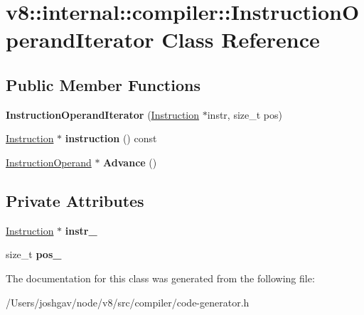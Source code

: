 \hypertarget{classv8_1_1internal_1_1compiler_1_1_instruction_operand_iterator}{}\section{v8\+:\+:internal\+:\+:compiler\+:\+:Instruction\+Operand\+Iterator Class Reference}
\label{classv8_1_1internal_1_1compiler_1_1_instruction_operand_iterator}
\subsection*{Public Member Functions}
\begin{DoxyCompactItemize}
\item 
{\bfseries Instruction\+Operand\+Iterator} (\hyperlink{classv8_1_1internal_1_1compiler_1_1_instruction}{Instruction} $\ast$instr, size\+\_\+t pos)\hypertarget{classv8_1_1internal_1_1compiler_1_1_instruction_operand_iterator_a14f190926e67ab3adf9a1f7df7fbcaf0}{}\label{classv8_1_1internal_1_1compiler_1_1_instruction_operand_iterator_a14f190926e67ab3adf9a1f7df7fbcaf0}

\item 
\hyperlink{classv8_1_1internal_1_1compiler_1_1_instruction}{Instruction} $\ast$ {\bfseries instruction} () const \hypertarget{classv8_1_1internal_1_1compiler_1_1_instruction_operand_iterator_a73acaf8244d1db970659dac67eeba2d7}{}\label{classv8_1_1internal_1_1compiler_1_1_instruction_operand_iterator_a73acaf8244d1db970659dac67eeba2d7}

\item 
\hyperlink{classv8_1_1internal_1_1compiler_1_1_instruction_operand}{Instruction\+Operand} $\ast$ {\bfseries Advance} ()\hypertarget{classv8_1_1internal_1_1compiler_1_1_instruction_operand_iterator_ad3c9891c93a16b4ba59b5e2f87325346}{}\label{classv8_1_1internal_1_1compiler_1_1_instruction_operand_iterator_ad3c9891c93a16b4ba59b5e2f87325346}

\end{DoxyCompactItemize}
\subsection*{Private Attributes}
\begin{DoxyCompactItemize}
\item 
\hyperlink{classv8_1_1internal_1_1compiler_1_1_instruction}{Instruction} $\ast$ {\bfseries instr\+\_\+}\hypertarget{classv8_1_1internal_1_1compiler_1_1_instruction_operand_iterator_ad00cfb97be63a37068741bd0dcd1dc4e}{}\label{classv8_1_1internal_1_1compiler_1_1_instruction_operand_iterator_ad00cfb97be63a37068741bd0dcd1dc4e}

\item 
size\+\_\+t {\bfseries pos\+\_\+}\hypertarget{classv8_1_1internal_1_1compiler_1_1_instruction_operand_iterator_a87339a4d6bd1679bdd8c69443a70d37b}{}\label{classv8_1_1internal_1_1compiler_1_1_instruction_operand_iterator_a87339a4d6bd1679bdd8c69443a70d37b}

\end{DoxyCompactItemize}


The documentation for this class was generated from the following file\+:\begin{DoxyCompactItemize}
\item 
/\+Users/joshgav/node/v8/src/compiler/code-\/generator.\+h\end{DoxyCompactItemize}
